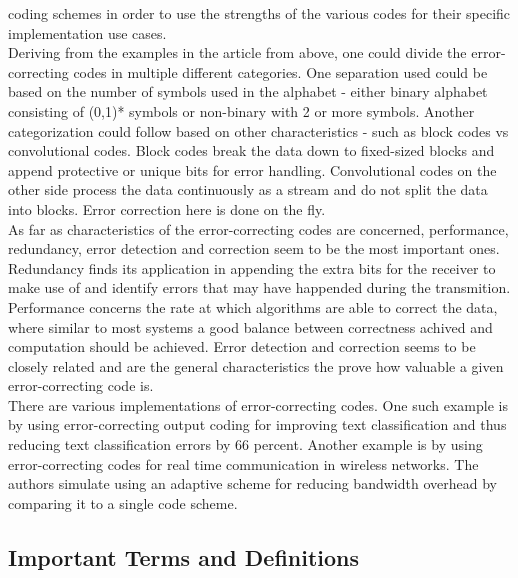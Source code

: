 \documentclass[12pt]%
{article}
\begin{document}
coding schemes in order to use the strengths of the various codes for their specific implementation use cases. \\
Deriving from the examples in the article from above, one could divide the error-correcting codes in multiple different categories. One separation used could be based on the number of symbols used in the alphabet - either binary alphabet consisting of (0,1)* symbols or non-binary with 2 or more symbols. Another categorization could follow based on other characteristics - such as block codes vs convolutional codes. Block codes break the data down to fixed-sized blocks and append protective or unique bits for error handling. Convolutional codes on the other side process the data continuously as a stream and do not split the data into blocks. Error correction here is done on the fly. \\
As far as characteristics of the error-correcting codes are concerned, performance, redundancy, error detection and correction seem to be the most important ones. Redundancy finds its application in appending the extra bits for the receiver to make use of and identify errors that may have happended during the transmition. Performance concerns the rate at which algorithms are able to correct the data, where similar to most systems a good balance between correctness achived and computation should be achieved. Error detection and correction seems to be closely related and are the general characteristics the prove how valuable a given error-correcting code is. \\
There are various implementations of error-correcting codes. One such example is by using error-correcting output coding for improving text classification and thus reducing text classification errors by 66 percent.\cite{ghani2000using} Another example is by using error-correcting codes for real time communication in wireless networks. \cite{elaoud1998adaptive} The authors simulate using an adaptive scheme for reducing bandwidth overhead by comparing it to a single code scheme.


\subsection{Important Terms and Definitions}
\end{document}
